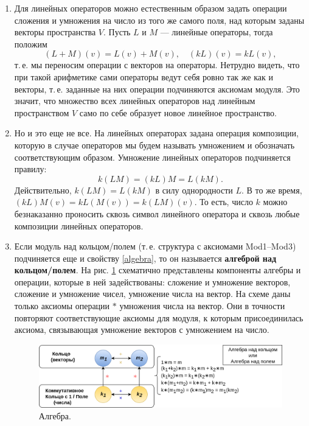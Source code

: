 \begin{enumerate}
\item Для линейных операторов можно естественным образом задать операции сложения и умножения на число из того же самого поля, над которым заданы векторы пространства $V$. Пусть $L$ и $M$ --- линейные операторы, тогда положим
$$
(L+M)(v) = L(v) + M(v),\quad (kL)(v) = kL(v),
$$
т.\,е. мы переносим операции с векторов на операторы. Нетрудно видеть, что при такой арифметике сами операторы ведут себя ровно так же как и векторы, т.\,е. заданные на них операции подчиняются аксиомам модуля. Это значит, что множество всех линейных операторов над линейным пространством $V$ само по себе образует новое линейное пространство.
\item Но и это еще не все. На линейных операторах задана операция композиции, которую в случае операторов мы будем называть умножением и обозначать соответствующим образом. Умножение линейных операторов подчиняется правилу:
\begin{equation}\label{algebra}
k(LM)=(kL)M=L(kM).
\end{equation}
Действительно, $k(LM)=L(kM)$ в силу однородности $L$. В то же время, $(kL)M(v)=kL(M(v))=k(LM)(v)$. То есть, число $k$ можно безнаказанно проносить сквозь символ линейного оператора и сквозь любые композиции линейных операторов.

\item Если модуль над кольцом/полем (т.\,е. структура с аксиомами Mod1--Mod3) подчиняется еще и свойству \eqref{algebra}, то он называется \textbf{алгеброй над кольцом/полем}. На рис. \ref{AlgebraOverRing} схематично представлены компоненты алгебры и операции, которые в ней задействованы: сложение и умножение векторов, сложение и умножение чисел, умножение числа на вектор. На схеме даны только аксиомы операции $*$ умножения числа на вектор. Они в точности повторяют соответствующие аксиомы для модуля, к которым присоединилась аксиома, связывающая умножение векторов с умножением на число.

\begin{figure}[hbt!]
\begin{center}
\includegraphics[scale=0.3]{AlgebraOverRing.png}
\end{center}\caption{Алгебра.}\label{AlgebraOverRing}
\end{figure}


\end{enumerate}
